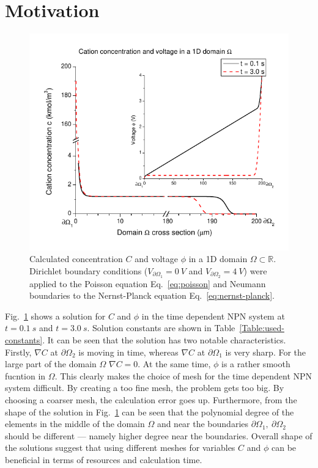 \section{Motivation}
\begin{figure}
  \begin{centering}
      \includegraphics[scale=0.4]{comsol_conc_volt}
  \caption{\label{fig:comsol-conc-volt}Calculated concentration $C$ and voltage $\phi$
  in a 1D domain $\Omega\subset\mathbb{R}$.
  Dirichlet boundary conditions ($V_{\partial \Omega_1}=0\ V$
  and $V_{\partial \Omega_2}=4\ V$) were
	applied to the Poisson equation Eq.~\eqref{eq:poisson} and Neumann boundaries
	to the Nernst-Planck equation Eq.~\eqref{eq:nernst-planck}.}
  \end{centering}
\end{figure}
Fig.~\ref{fig:comsol-conc-volt} shows a solution for $C$ and $\phi$ in
the time dependent NPN system at $t=0.1\ s$ and $t=3.0\ s$. Solution
constants are shown in Table~\ref{Table:used-constants}.
It can be seen that the solution has two notable characteristics. 
Firstly, $\nabla C$ at $\partial \Omega_2$ is
moving in time, whereas $\nabla C$ at $\partial \Omega_1$ is very
sharp. For the large part of the domain $\Omega$ $\nabla C=0$.
At the same time, $\phi$ is a rather smooth fucntion in $\Omega$.
This clearly makes the choice of mesh for the time dependent NPN
system difficult. By creating a too fine mesh, the problem gets
too big. By choosing a coarser mesh, the calculation error goes up.
Furthermore, from the shape of the solution in Fig.~\ref{fig:comsol-conc-volt}
can be seen that the polynomial degree of the elements in the middle
of the domain $\Omega$ and near the boundaries $\partial \Omega_1,\ \partial \Omega_2$
should be different --- namely higher degree near the boundaries. 
Overall shape of the solutions suggest that
using different meshes for variables $C$ and $\phi$ can be beneficial
in terms of resources and calculation time.

